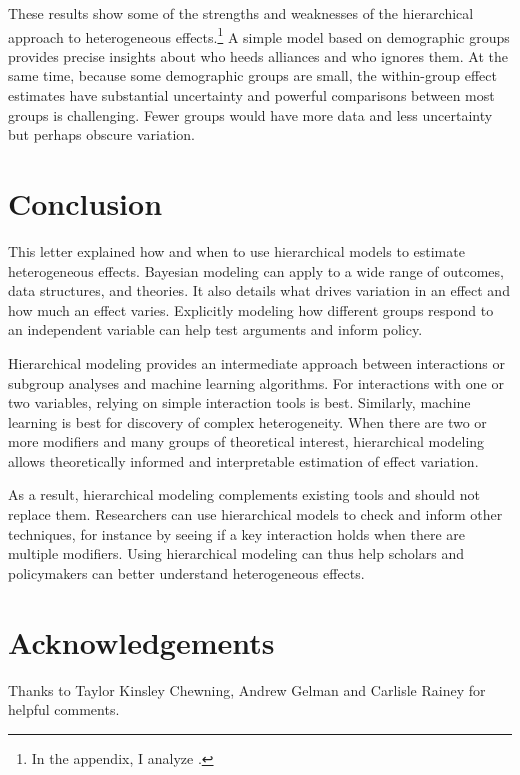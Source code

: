 \documentclass[12pt]{article}
\begin{document}

These results show some of the strengths and weaknesses of the hierarchical approach to heterogeneous effects.\footnote{In the appendix, I analyze \citet{BushPrather2020}.}
A simple model based on demographic groups provides precise insights about who heeds alliances and who ignores them.  
At the same time, because some demographic groups are small, the within-group effect estimates have substantial uncertainty and powerful comparisons between most groups is challenging. 
Fewer groups would have more data and less uncertainty but perhaps obscure variation.


\section{Conclusion}


This letter explained how and when to use hierarchical models to estimate heterogeneous effects. 
Bayesian modeling can apply to a wide range of outcomes, data structures, and theories. 
It also details what drives variation in an effect and how much an effect varies. 
Explicitly modeling how different groups respond to an independent variable can help test arguments and inform policy.  


Hierarchical modeling provides an intermediate approach between interactions or subgroup analyses and machine learning algorithms. 
For interactions with one or two variables, relying on simple interaction tools is best. 
Similarly, machine learning is best for discovery of complex heterogeneity.
When there are two or more modifiers and many groups of theoretical interest, hierarchical modeling allows theoretically informed and interpretable estimation of effect variation. 

As a result, hierarchical modeling complements existing tools and should not replace them. 
Researchers can use hierarchical models to check and inform other techniques, for instance by seeing if a key interaction holds when there are multiple modifiers. 
Using hierarchical modeling can thus help scholars and policymakers can better understand heterogeneous effects.


\section*{Acknowledgements}

Thanks to Taylor Kinsley Chewning, Andrew Gelman and Carlisle Rainey for helpful comments.

\singlespace
 


%
\end{document}

